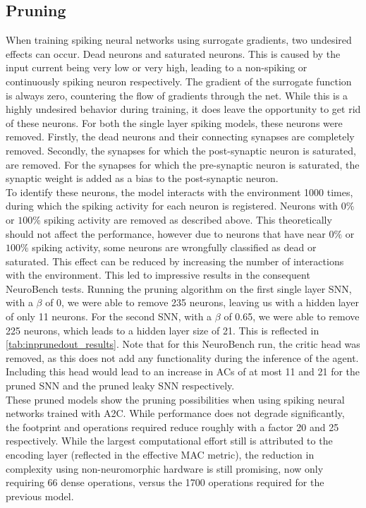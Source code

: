 \subsection{Pruning}
When training spiking neural networks using surrogate gradients, two undesired effects can occur. Dead neurons and saturated neurons. This is caused by the input current being very low or very high, leading to a non-spiking or continuously spiking neuron respectively. The gradient of the surrogate function is always zero, countering the flow of gradients through the net. While this is a highly undesired behavior during training, it does leave the opportunity to get rid of these neurons. For both the single layer spiking models, these neurons were removed. Firstly, the dead neurons and their connecting synapses are completely removed. Secondly, the synapses for which the post-synaptic neuron is saturated, are removed. For the synapses for which the pre-synaptic neuron is saturated, the synaptic weight is added as a bias to the post-synaptic neuron. \\
To identify these neurons, the model interacts with the environment 1000 times, during which the spiking activity for each neuron is registered. Neurons with $0\%$ or $100\%$ spiking activity are removed as described above. This theoretically should not affect the performance, however due to neurons that have near $0\%$ or $100\%$ spiking activity, some neurons are wrongfully classified as dead or saturated. This effect can be reduced by increasing the number of interactions with the environment. This led to impressive results in the consequent NeuroBench tests. Running the pruning algorithm on the first single layer SNN, with a $\beta$ of 0, we were able to remove 235 neurons, leaving us with a hidden layer of only 11 neurons. For the second SNN, with  a $\beta$ of 0.65, we were able to remove 225 neurons, which leads to a hidden layer size of 21. This is reflected in \autoref{tab:inprunedout_results}. Note that for this NeuroBench run, the critic head was removed, as this does not add any functionality during the inference of the agent. Including this head would lead to an increase in ACs of at most 11 and 21 for the pruned SNN and the pruned leaky SNN respectively.
\\
These pruned models show the pruning possibilities when using spiking neural networks trained with A2C. While performance does not degrade significantly, the footprint and operations required reduce roughly with a factor 20 and 25 respectively. While the largest computational effort still is attributed to the encoding layer (reflected in the effective MAC metric), the reduction in complexity using non-neuromorphic hardware is still promising, now only requiring 66 dense operations, versus the 1700 operations required for the previous model. 
